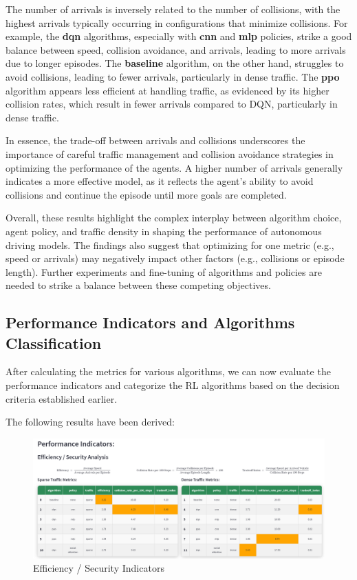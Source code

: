 The number of arrivals is inversely related to the number of collisions, with the highest arrivals typically occurring in configurations that minimize collisions. 
For example, the \textbf{dqn} algorithms, especially with \textbf{cnn} and \textbf{mlp} policies, strike a good balance between speed, collision avoidance, and arrivals, leading to more arrivals due to longer episodes. 
The \textbf{baseline} algorithm, on the other hand, struggles to avoid collisions, leading to fewer arrivals, particularly in dense traffic. 
The \textbf{ppo} algorithm appears less efficient at handling traffic, as evidenced by its higher collision rates, which result in fewer arrivals compared to DQN, particularly in dense traffic.

In essence, the trade-off between arrivals and collisions underscores the importance of careful traffic management and collision avoidance strategies in optimizing the performance of the agents. 
A higher number of arrivals generally indicates a more effective model, as it reflects the agent's ability to avoid collisions and continue the episode until more goals are completed.

Overall, these results highlight the complex interplay between algorithm choice, agent policy, and traffic density in shaping the performance of autonomous driving models. 
The findings also suggest that optimizing for one metric (e.g., speed or arrivals) may negatively impact other factors (e.g., collisions or episode length). 
Further experiments and fine-tuning of algorithms and policies are needed to strike a balance between these competing objectives.

\newpage

\subsection{Performance Indicators and Algorithms Classification}

After calculating the metrics for various algorithms, we can now evaluate the performance indicators and categorize the RL algorithms based on the decision criteria established earlier.

The following results have been derived:

\begin{figure}[H]
    \centering
    \includegraphics[height=0.3\textheight]{images/app_indicators_efficiency.png} 
    \caption{Efficiency / Security Indicators}
\end{figure}

